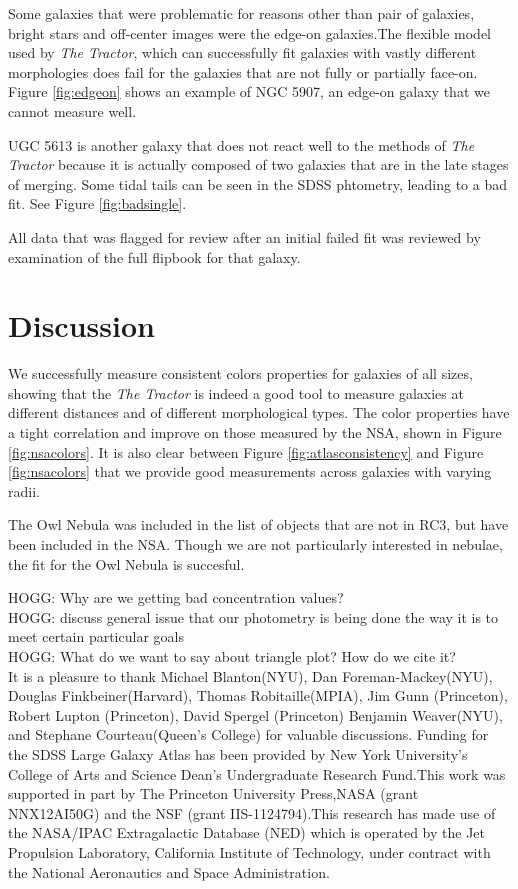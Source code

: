 \documentclass[12pt,preprint,pdftex]{aastex}
\begin{document}
Some galaxies that were problematic for reasons other than pair of
galaxies, bright stars and off-center images were the edge-on
galaxies.The flexible model used by \emph{The Tractor}, which can
successfully fit galaxies with vastly different morphologies does fail
for the galaxies that are not fully or partially face-on. Figure
\ref{fig:edgeon} shows an example of NGC 5907, an edge-on galaxy that
we cannot measure well.
 
UGC 5613 is another galaxy that does not react well to the methods of
\emph{The Tractor} because it is actually composed of two galaxies
that are in the late stages of merging. Some tidal tails can be seen
in the SDSS phtometry, leading to a bad fit. See Figure
\ref{fig:badsingle}.

All data that was flagged for review after an initial failed fit was
reviewed by examination of the full flipbook for that galaxy.

\section{Discussion}\label{sec:discussion}
We successfully measure consistent colors properties for galaxies of
all sizes, showing that the \emph{The Tractor} is indeed a good tool
to measure galaxies at different distances and of different
morphological types. The color properties have a tight correlation and
improve on those measured by the NSA, shown in Figure
\ref{fig:nsacolors}. It is also clear between Figure
\ref{fig:atlasconsistency} and Figure \ref{fig:nsacolors} that we
provide good measurements across galaxies with varying radii.

The Owl Nebula was included in the list of objects that are not in
RC3, but have been included in the NSA. Though we are not
particularly interested in nebulae, the fit for the Owl Nebula is
succesful. 

HOGG: Why are we getting bad concentration values?\\
HOGG: discuss general issue that our photometry is being done the way it is to meet certain particular goals\\
HOGG: What do we want to say about triangle plot? How do we cite it?\\

\acknowledgements It is a pleasure to thank Michael Blanton(NYU), Dan
Foreman-Mackey(NYU), Douglas Finkbeiner(Harvard), Thomas
Robitaille(MPIA), Jim Gunn (Princeton),
Robert Lupton (Princeton), David Spergel (Princeton) Benjamin
Weaver(NYU), and Stephane Courteau(Queen's College) for valuable
discussions. Funding for the SDSS Large Galaxy Atlas has been provided
by New York University's College of Arts and Science Dean's
Undergraduate Research Fund.This work was supported in part by The
Princeton University Press,NASA (grant NNX12AI50G) and the NSF (grant
IIS-1124794).This research has made use of the NASA/IPAC Extragalactic
Database (NED) which is operated by the Jet Propulsion Laboratory,
California Institute of Technology, under contract with the National
Aeronautics and Space Administration.
\end{document}
